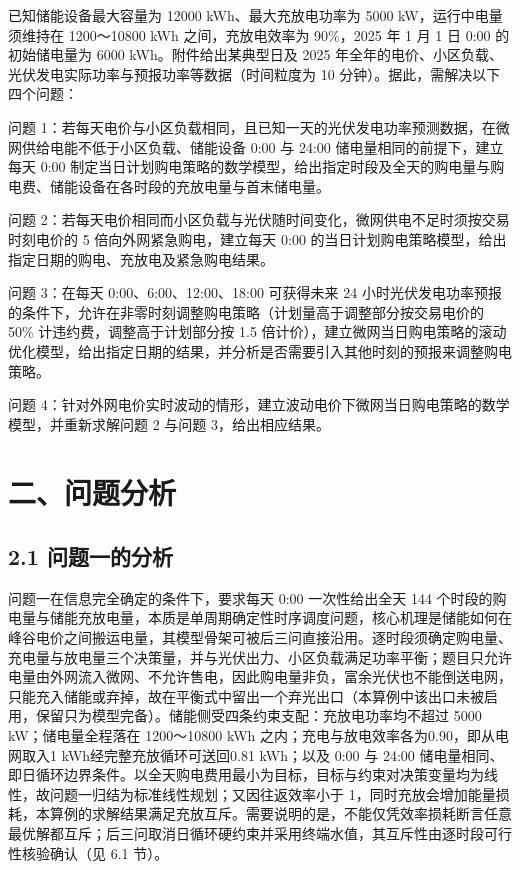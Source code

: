 \documentclass[12pt,a4paper]{ctexart}
\begin{document}
已知储能设备最大容量为 12000 kWh、最大充放电功率为 5000 kW，运行中电量须维持在 1200～10800 kWh 之间，充放电效率为 90\%，2025 年 1 月 1 日 0:00 的初始储电量为 6000 kWh。附件给出某典型日及 2025 年全年的电价、小区负载、光伏发电实际功率与预报功率等数据（时间粒度为 10 分钟）。据此，需解决以下四个问题：

问题 1：若每天电价与小区负载相同，且已知一天的光伏发电功率预测数据，在微网供给电能不低于小区负载、储能设备 0:00 与 24:00 储电量相同的前提下，建立每天 0:00 制定当日计划购电策略的数学模型，给出指定时段及全天的购电量与购电费、储能设备在各时段的充放电量与首末储电量。

问题 2：若每天电价相同而小区负载与光伏随时间变化，微网供电不足时须按交易时刻电价的 5 倍向外网紧急购电，建立每天 0:00 的当日计划购电策略模型，给出指定日期的购电、充放电及紧急购电结果。

问题 3：在每天 0:00、6:00、12:00、18:00 可获得未来 24 小时光伏发电功率预报的条件下，允许在非零时刻调整购电策略（计划量高于调整部分按交易电价的 50\% 计违约费，调整高于计划部分按 1.5 倍计价），建立微网当日购电策略的滚动优化模型，给出指定日期的结果，并分析是否需要引入其他时刻的预报来调整购电策略。

问题 4：针对外网电价实时波动的情形，建立波动电价下微网当日购电策略的数学模型，并重新求解问题 2 与问题 3，给出相应结果。

\section*{二、问题分析}

\subsection*{2.1 问题一的分析}

问题一在信息完全确定的条件下，要求每天 0:00 一次性给出全天 144 个时段的购电量与储能充放电量，本质是单周期确定性时序调度问题，核心机理是储能如何在峰谷电价之间搬运电量，其模型骨架可被后三问直接沿用。逐时段须确定购电量、充电量与放电量三个决策量，并与光伏出力、小区负载满足功率平衡；题目只允许电量由外网流入微网、不允许售电，因此购电量非负，富余光伏也不能倒送电网，只能充入储能或弃掉，故在平衡式中留出一个弃光出口（本算例中该出口未被启用，保留只为模型完备）。储能侧受四条约束支配：充放电功率均不超过 5000 kW；储电量全程落在 1200～10800 kWh 之内；充电与放电效率各为0.90，即从电网取入1 kWh经完整充放循环可送回0.81 kWh；以及 0:00 与 24:00 储电量相同、即日循环边界条件。以全天购电费用最小为目标，目标与约束对决策变量均为线性，故问题一归结为标准线性规划；又因往返效率小于 1，同时充放会增加能量损耗，本算例的求解结果满足充放互斥。需要说明的是，不能仅凭效率损耗断言任意最优解都互斥；后三问取消日循环硬约束并采用终端水值，其互斥性由逐时段可行性核验确认（见 6.1 节）。
\end{document}
